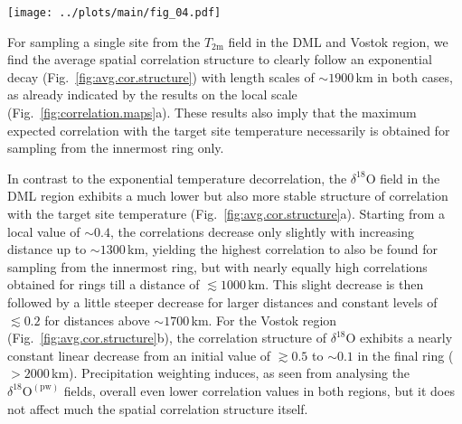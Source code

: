 \documentclass[cp, manuscript]{copernicus}
\begin{document}
\begin{figure*}[t]%
\centering
\texttt{[image: ../plots/main/fig\_04.pdf]}
\caption{%
  Spatial temperature correlation structures for the DML and Vostok regions.
  Shown is the average correlation as a function of distance between the
  interannual near-surface temperature ($T_{2\mathrm{m}}$) and the spatial
  fields of $T_{2\mathrm{m}}$ (black), oxygen isotope ($\delta^{18}\mathrm{O}$,
  green) and precipitation-weighted oxygen isotope composition
  ($\delta^{18}\mathrm{O}^{\mathrm{(pw)}}$, blue). Averaging is performed in two
  steps: first, correlations are averaged across grid cells falling in $250$\,km
  wide consecutive rings around a given target site, and secondly, these results
  are averaged across all respective target sites in the DML (\textbf{a}) and
  Vostok (\textbf{b}) region (see Methods). Dashed lines indicate an exponential
  fit to the $T_{2\mathrm{m}}$ data.}
\label{fig:avg.cor.structure}%
\end{figure*}%

For sampling a single site from the $T_{\mathrm{2m}}$ field in the DML and
Vostok region, we find the average spatial correlation structure to clearly
follow an exponential decay (Fig.~\ref{fig:avg.cor.structure}) with length
scales of $\sim1900$\,km in both cases, as already indicated by the results on
the local scale (Fig.~\ref{fig:correlation.maps}a). These results also imply
that the maximum expected correlation with the target site temperature
necessarily is obtained for sampling from the innermost ring only.

In contrast to the exponential temperature decorrelation, the
$\delta^{18}\mathrm{O}$ field in the DML region exhibits a much lower but also
more stable structure of correlation with the target site temperature
(Fig.~\ref{fig:avg.cor.structure}a). Starting from a local value of $\sim0.4$,
the correlations decrease only slightly with increasing distance up to
$\sim1300$\,km, yielding the highest correlation to also be found for sampling
from the innermost ring, but with nearly equally high correlations obtained for
rings till a distance of $\lesssim1000$\,km. This slight decrease is then
followed by a little steeper decrease for larger distances and constant levels
of $\lesssim0.2$ for distances above $\sim1700$\,km. For the Vostok region
(Fig.~\ref{fig:avg.cor.structure}b), the correlation structure of
$\delta^{18}\mathrm{O}$ exhibits a nearly constant linear decrease from an
initial value of $\gtrsim0.5$ to $\sim0.1$ in the final ring ($>2000$\,km).
Precipitation weighting induces, as seen from analysing the
$\delta^{18}\mathrm{O}^{\mathrm{(pw)}}$ fields, overall even lower correlation
values in both regions, but it does not affect much the spatial correlation
structure itself.
\end{document}
